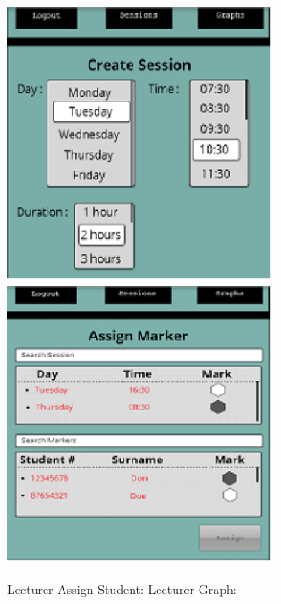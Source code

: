 \documentclass{article}
\begin{document}
\noindent \textbf{\includegraphics*[width=3.10in, height=3.19in, keepaspectratio=false]{image9}   \includegraphics*[width=3.10in, height=3.22in, keepaspectratio=false]{image10}}

\noindent \textbf{}

\noindent \textbf{}

\noindent \textbf{}

\noindent \textbf{}

\noindent \textbf{}

\noindent \textbf{}

\noindent \textbf{}

\textbf{ }  Lecturer Assign Student:     Lecturer Graph:
\end{document}
